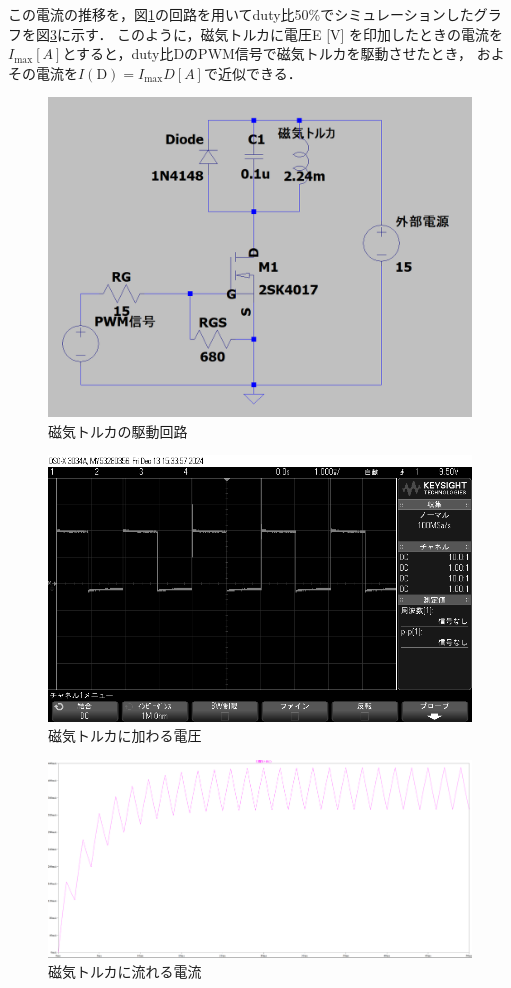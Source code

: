 この電流の推移を，図\ref{fig:cirkit}の回路を用いてduty比50\%でシミュレーションしたグラフを図\ref{fig:current50}に示す．
このように，磁気トルカに電圧E [V] を印加したときの電流を$I_\mathrm{max} [A]$とすると，duty比DのPWM信号で磁気トルカを駆動させたとき，
およその電流を$I(\mathrm{D})=I_\mathrm{max}D [A]$で近似できる． 

\begin{figure}[H]
	\centering
		\includegraphics[scale=0.3]{./figure/回路図.png}
		\caption{磁気トルカの駆動回路}
		\label{fig:cirkit}
\end{figure}

\begin{figure}[H]
	\centering
		\includegraphics[scale=0.3]{./figure/scope_11.png}
		\caption{磁気トルカに加わる電圧}
		\label{fig:osiro2}
\end{figure}

\begin{figure}[H]
	\centering
		\includegraphics[scale=0.3]{./figure/50current.png}
		\caption{磁気トルカに流れる電流}
		\label{fig:current50}
\end{figure}

